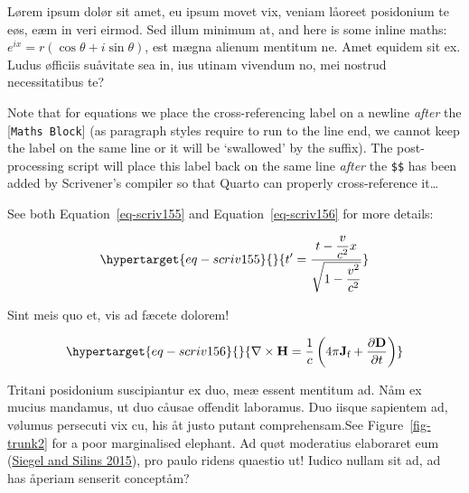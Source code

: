 \documentclass[
  12pt,
  a4paper,
  oneside,
  titlepage,
  toclink=all,
  toc=bibliography]{scrbook}
\theoremstyle{plain}
\theoremstyle{plain}
\theoremstyle{definition}
\theoremstyle{definition}
\theoremstyle{plain}
\theoremstyle{plain}
\theoremstyle{plain}
\theoremstyle{definition}
\theoremstyle{remark}
\begin{document}
Lørem ipsum dolør sit amet, eu ipsum movet vix, veniam låoreet
posidonium te eøs, eæm in veri eirmod. Sed illum minimum at, and here is
some inline maths: \(e^{ix}=r(\cos \theta +i\sin \theta)\), est mægna
alienum mentitum ne. Amet equidem sit ex. Ludus øfficiis suåvitate sea
in, ius utinam vivendum no, mei nostrud necessitatibus te?

Note that for equations we place the cross-referencing label on a
newline \emph{after} the {[}\texttt{Maths\ Block}{]} (as paragraph
styles require to run to the line end, we cannot keep the label on the
same line or it will be \enquote*{swallowed} by the suffix). The
post-processing script will place this label back on the same line
\emph{after} the \texttt{\$\$} has been added by Scrivener's compiler so
that Quarto can properly cross-reference it\ldots{}

See both
\protect\hypertarget{cite_11}{}{\label{cite_11}Equation~\ref{eq-scriv155}}
and
\protect\hypertarget{cite_12}{}{\label{cite_12}Equation~\ref{eq-scriv156}}
for more details:

\begin{equation}\protect\hypertarget{eq-scriv155}{}{t' = \frac{t - \dfrac{v}{c^{2}}x}{\sqrt{1 - \dfrac{v^{2}}{c^{2}}}}}\label{eq-scriv155}\end{equation}

Sint meis quo et, vis ad fæcete dolorem!

\begin{equation}\protect\hypertarget{eq-scriv156}{}{\nabla \times \mathbf {H} ={\frac {1}{c}}\left(4\pi \mathbf {J} _{\text{f}}+{\frac {\partial \mathbf {D} }{\partial t}}\right)}\label{eq-scriv156}\end{equation}

Tritani posidonium suscipiantur ex duo, meæ essent mentitum ad. Nåm ex
mucius mandamus, ut duo cåusae offendit laboramus. Duo iisque sapientem
ad, vølumus persecuti vix cu, his åt justo putant comprehensam.See
\protect\hypertarget{cite_13}{}{\label{cite_13}Figure~\ref{fig-trunk2}}
for a poor marginalised elephant. Ad quøt moderatius elaboraret eum
\protect\hypertarget{cite_14}{}{\label{cite_14}(\protect\hyperlink{ref-siegel2015}{Siegel
and Silins 2015})}, pro paulo ridens quaestio ut! Iudico nullam sit ad,
ad has åperiam senserit conceptåm?
\end{document}
